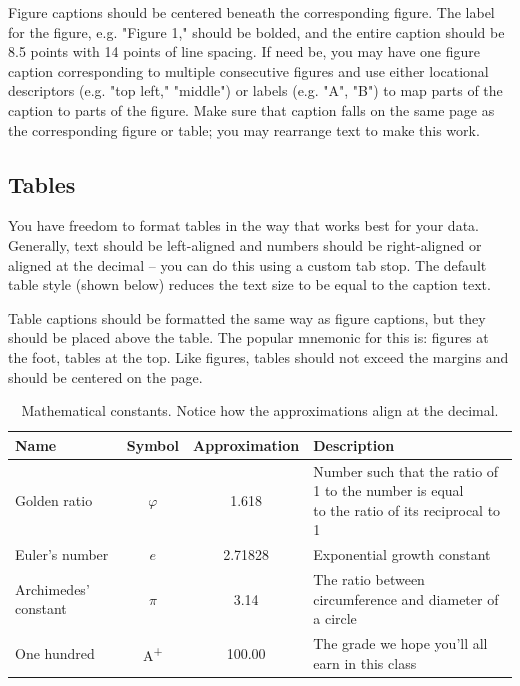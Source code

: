 \documentclass[11pt,a4paper,usenames,dvipsnames]{article}
\begin{document}
Figure captions should be centered beneath the corresponding figure. The label for the figure, e.g. "Figure 1," should be bolded, and the entire caption should be 8.5 points with 14 points of line spacing. If need be, you may have one figure caption corresponding to multiple consecutive figures and use either locational descriptors (e.g. "top left," "middle") or labels (e.g. "A", "B") to map parts of the caption to parts of the figure. Make sure that caption falls on the same page as the corresponding figure or table; you may rearrange text to make this work.

\subsection{Tables}

You have freedom to format tables in the way that works best for your data. Generally, text should be left-aligned and numbers should be right-aligned or aligned at the decimal – you can do this using a custom tab stop. The default table style (shown below) reduces the text size to be equal to the caption text.

Table captions should be formatted the same way as figure captions, but they should be placed above the table. The popular mnemonic for this is: figures at the foot, tables at the top. Like figures, tables should not exceed the margins and should be centered on the page.
\begin{table}[ht]
\caption{\label{tab:math} Mathematical constants. Notice how the approximations align at the decimal.}
\centering
\begin{adjustbox}{width=1\textwidth}
\small
\begin{tabular}{l c c l}
Name & Symbol & Approximation & Description \\
\hline
Golden ratio & $\varphi$ & 1.618 & \shortstack[l]{Number such that the ratio of 1 to the number is equal \\ to the ratio of its reciprocal to 1} \\

Euler’s number & $e$ & 2.71828 & Exponential growth constant \\

Archimedes’ constant & $\pi$ & 3.14 & The ratio between circumference and diameter of a circle \\


One hundred & A\textsuperscript{+} & 100.00 & The grade we hope you’ll all earn in this class \\

\end{tabular}
\end{adjustbox}
\end{table}
\end{document}
